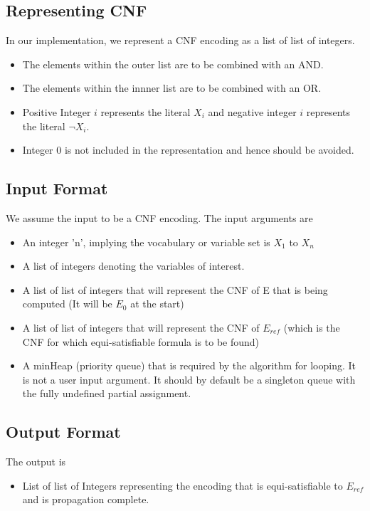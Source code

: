 \documentclass{article}
\theoremstyle{plain}
\begin{document}
\subsection{Representing CNF}
In our implementation, we represent a CNF encoding as a list of list of integers.
\begin{itemize}
\item The elements within the outer list are to be combined with an AND.
\item The elements within the innner list are to be combined with an OR.
\item Positive Integer $i$ represents the literal $X_i$ and negative integer $i$ represents the literal $\neg X_i$. 
\item Integer $0$ is not included in the representation and hence should be avoided.
\end{itemize}
\subsection{Input Format}
We assume the input to be a CNF encoding. The input arguments are 
\begin{itemize}
\item An integer 'n', implying the vocabulary or variable set is $X_1$ to $X_n$
\item A list of integers denoting the variables of interest.
\item A list of list of integers that will represent the CNF of E that is being computed (It will be $E_0$ at the start)
\item A list of list of integers that will represent the CNF of $E_{ref}$ (which is the CNF for which equi-satisfiable formula is to be found)
\item A minHeap (priority queue) that is required by the algorithm for looping. It is not a user input argument. It should by default be a singleton queue with the fully undefined partial assignment.
\end{itemize}
\subsection{Output Format}
The output is 
\begin{itemize}
\item List of list of Integers representing the encoding that is equi-satisfiable to $E_{ref}$ and is propagation complete.
\end{itemize}
\end{document}

